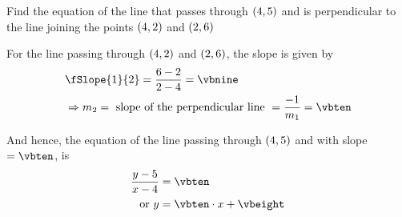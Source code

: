 \gcalcexpr[2]{\vbseven}{\vbfour - \vbtwo}
\gcalcexpr[2]{\vbeight}{ \vbthree - \vbone}
\gcalcexpr[0]{\vbnine}{(\vbseven / \vbeight) }

\gcalcexpr[2]{\vbeight}{\vbsix - (\vbten * \vbfive)}

\question[2] Find the equation of the line that passes through $(4,5)$ and 
is perpendicular to the line joining the points $(4,2)$ and $(2, 6)$


\watchout

\ifprintanswers
\fi 

\begin{solution}[\halfpage]
	For the line passing through $(4, 2)$ and $(2, 6)$, the slope is given by 
	\begin{align}
		& \fSlope{1}{2} = \dfrac{\vbfour - \vbtwo}{\vbthree - \vbone} = \vbnine \\
		& \Rightarrow m_2 = \text{ slope of the perpendicular line } = \dfrac{-1}{m_1} = \vbten
	\end{align}
	
	And hence, the equation of the line passing through $(4,5)$ and with slope $= \vbten$, is
	\begin{align}
		\dfrac{y-\vbsix}{x-\vbfive} &= \vbten \\
		\text{ or } y &= \vbten\cdot x + \vbeight
	\end{align}
\end{solution}
